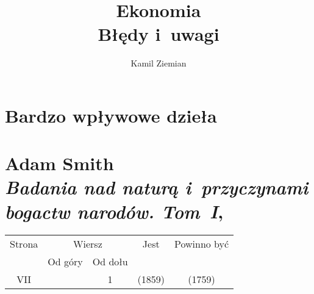 \documentclass[a4paper,11pt]{article}
\title{Ekonomia \\
  {\Large Błędy i~uwagi}}
\author{Kamil Ziemian}
\numberwithin{equation}{section}
\begin{document}





\maketitle %





\section{Bardzo wpływowe dzieła}

\VerSpaceTwo



\section{ %
  Adam Smith \\
  \textit{Badania nad naturą i~przyczynami bogactw narodów. Tom~I},
  \cite{} }




\begin{center}

  \begin{tabular}{|c|c|c|c|c|}
    \hline
    Strona & \multicolumn{2}{c|}{Wiersz} & Jest
                              & Powinno być \\ \cline{2-3}
    & Od góry & Od dołu & & \\
    \hline
    VII & & 1 & (1859) & (1759) \\
    \hline
  \end{tabular}

\end{center}

\VerSpaceTwo












\end{document}
